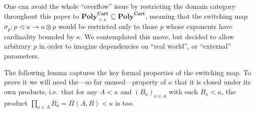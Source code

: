 \documentclass[11pt, one side, article]{memoir}
\theoremstyle{definition}
\theoremstyle{plain}
\renewcommand{\ss}{\subseteq}
\newcommand{\Cat}[1]{\mathbf{#1}}%
\newcommand{\poly}{\Cat{Poly}}
\newcommand{\polycart}{\poly^{\Cat{Cart}}}
\newcommand{\0}{\textsf{0}}
\newcommand{\1}{\tn{\textsf{1}}}
\newcommand{\tri}{\mathbin{\triangleleft}}
\begin{document}
One can avoid the whole ``overflow'' issue by restricting the domain category throughout this paper to $\polycart_{<\kappa}\ss\polycart$, meaning that the switching map $\sigma_p\colon p\tri u\to u\otimes p$ would be restricted only to those $p$ whose exponents have cardinality bounded by $\kappa$. We contemplated this move, but decided to allow arbitrary $p$ in order to imagine dependencies on ``real world'', or ``external'' parameters.

The following lemma captures the key formal properties of the switching map. To prove it we will need the---so far unused---property of $\kappa$ that it is closed under its own products, i.e.\ that for any $A<\kappa$ and $(B_a)_{a\in A}$ with each $B_a<\kappa$, the product $\prod_{a\in A}B_a=\Pi(A,B)<\kappa$ is too.
\end{document}

